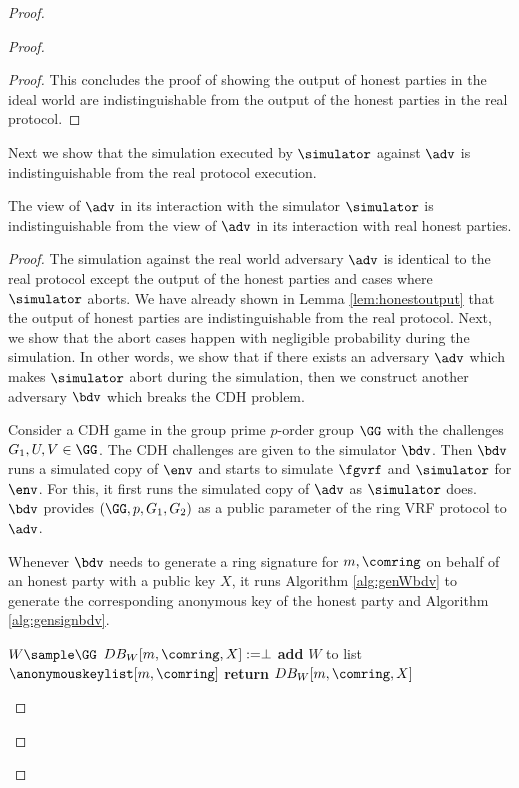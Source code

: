 \begin{proof}
\begin{proof}
\begin{proof}
			This concludes the proof of showing the output of honest parties in the ideal world are indistinguishable from the output of the honest parties in the real protocol.
		\end{proof}	
		
		Next we show that the simulation executed by $ \simulator $ against $ \adv $ is indistinguishable from the real protocol execution.
		
		\begin{lemma} 
			The view of $ \adv $ in its interaction with the simulator $ \simulator $ is indistinguishable from the view of $ \adv $ in its interaction with real honest parties.
		\end{lemma}
		
		
		\begin{proof}
			The  simulation against the real world adversary $ \adv $ is identical to the real protocol except the output of the honest parties and cases where $ \simulator $ aborts. We have already shown in Lemma \ref{lem:honestoutput} that the output of honest parties are indistinguishable from the real protocol. Next, we show that the abort cases happen with negligible probability during the simulation. In other words, we show that if there exists an adversary $ \adv $ which makes $ \simulator $ abort during the simulation, then we construct another adversary $ \bdv $ which breaks the CDH problem. 
			
			Consider a CDH game in the group prime $ p $-order group  $ \GG $ with the challenges $ G_1,U, V \in \GG$. The CDH challenges are given to the simulator $ \bdv $. Then $ \bdv $ runs a simulated copy of $ \env $ and starts to simulate $ \fgvrf $ and $ \simulator $ for $ \env $. For this, it first runs the simulated copy of $ \adv $ as $ \simulator $ does. $ \bdv $ provides $ (\GG, p, G_1 , G_2) $ as a public parameter of the ring VRF protocol to $ \adv $.
			
			Whenever $ \bdv $ needs to generate a ring signature for $ m, \comring $ on behalf of an honest party with a public key $ X $, it runs  Algorithm \ref{alg:genWbdv} to generate the corresponding anonymous key of the honest party and Algorithm \ref{alg:gensignbdv}. 
			
			\begin{algorithm}
				\caption{$\gen_{W}(\comring,X, m)$}
				\label{alg:genWbdv}	 	
				\begin{algorithmic}[1]
					\State $ W \sample \GG$
					\State $ DB_W[m,\comring, X] := \perp $
					\State \textbf{add} $ W $ to list $ \anonymouskeylist[m,\comring] $
					\EndIf
					\State \textbf{return} $ DB_W[m,\comring, X] $
				\end{algorithmic}
			\end{algorithm}
			

\end{proof}
\end{proof}
\end{proof}
